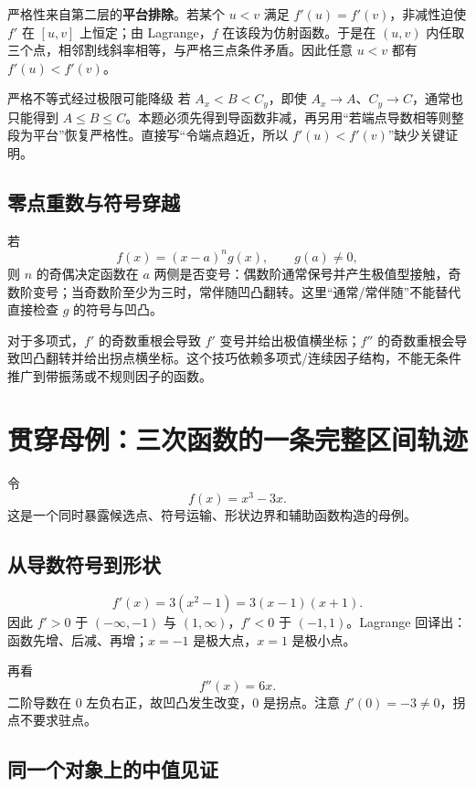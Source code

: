 \documentclass[UTF8,fontset=none,11pt,a4paper]{ctexart}
\begin{document}
严格性来自第二层的\textbf{平台排除}。若某个 $u<v$ 满足 $f'(u)=f'(v)$，非减性迫使
$f'$ 在 $[u,v]$ 上恒定；由 Lagrange，$f$ 在该段为仿射函数。于是在 $(u,v)$ 内任取三个点，相邻割线斜率相等，与严格三点条件矛盾。因此任意 $u<v$ 都有 $f'(u)<f'(v)$。

\begin{warnbox}{严格不等式经过极限可能降级}
若 $A_x<B<C_y$，即使 $A_x\to A$、$C_y\to C$，通常也只能得到 $A\le B\le C$。本题必须先得到导函数非减，再另用``若端点导数相等则整段为平台''恢复严格性。直接写``令端点趋近，所以 $f'(u)<f'(v)$''缺少关键证明。
\end{warnbox}

\subsection{零点重数与符号穿越}

若
\[
f(x)={(x-a)}^n g(x),
\qquad g(a)\ne0,
\]
则 $n$ 的奇偶决定函数在 $a$ 两侧是否变号：偶数阶通常保号并产生极值型接触，奇数阶变号；当奇数阶至少为三时，常伴随凹凸翻转。这里“通常/常伴随”不能替代直接检查 $g$ 的符号与凹凸。

对于多项式，$f'$ 的奇数重根会导致 $f'$ 变号并给出极值横坐标；$f''$ 的奇数重根会导致凹凸翻转并给出拐点横坐标。这个技巧依赖多项式/连续因子结构，不能无条件推广到带振荡或不规则因子的函数。

\section{贯穿母例：三次函数的一条完整区间轨迹}

令
\[
f(x)=x^3-3x.
\]
这是一个同时暴露候选点、符号运输、形状边界和辅助函数构造的母例。

\subsection{从导数符号到形状}

\[
f'(x)=3(x^2-1)=3(x-1)(x+1).
\]
因此 $f'>0$ 于 $(-\infty,-1)$ 与 $(1,\infty)$，$f'<0$ 于 $(-1,1)$。Lagrange 回译出：函数先增、后减、再增；$x=-1$ 是极大点，$x=1$ 是极小点。

再看
\[
f''(x)=6x.
\]
二阶导数在 $0$ 左负右正，故凹凸发生改变，$0$ 是拐点。注意 $f'(0)=-3\ne0$，拐点不要求驻点。

\subsection{同一个对象上的中值见证}
\end{document}
